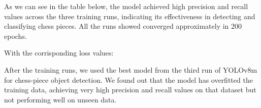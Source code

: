 As we can see in the table below, the model achieved high precision
 and recall values across the three training runs,
indicating its effectiveness in detecting and classifying chess pieces.
All the runs showed converged approximately in 200 epochs.

\begin{table}[ht]
\centering
\caption{Key performance metrics for the three YOLOv8m training runs.}
\label{tab:YOLOv8-results}
\end{table}

With the corrisponding loss values:
\begin{table}[ht]
\centering
\caption{Loss values for the three YOLOv8m runs. All values are approximate and taken at convergence (step $\sim$200).}
\label{tab:yolov8-loss}
\end{table}

After the training runs, we used the best model from the third run of YOLOv8m for chess-piece object detection.
We found out that the model has overfitted the training data, achieving very high precision and recall values on that dataset but not performing well on unseen data.

